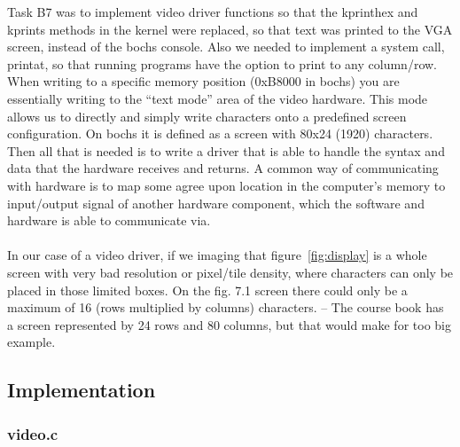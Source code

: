 Task B7 was to implement video driver functions so that the kprinthex and kprints methods in the kernel were replaced, so that text was printed to the VGA screen, instead of the bochs console. Also we needed to implement a system call, printat, so that running programs have the option to print to any column/row. When writing to a specific memory position (0xB8000 in bochs) you are essentially writing to the ``text mode'' area of the video hardware. This mode allows us to directly and simply write characters onto a predefined screen configuration. On bochs it is defined as a screen with 80x24 (1920) characters. Then all that is needed is to write a driver that is able to handle the syntax and data that the hardware receives and returns. A common way of communicating with hardware is to map some agree upon location in the computer's memory to input/output signal of another hardware component, which the software and hardware is able to communicate via.\\\\

In our case of a video driver, if we imaging that figure~\ref{fig:display} is a whole screen with very bad resolution or pixel/tile density, where characters can only be placed in those limited boxes. On the fig. 7.1 screen there could only be a maximum of 16 (rows multiplied by columns) characters. – The course book has a screen represented by 24 rows and 80 columns, but that would make for too big example.
\subsection{Implementation}
\subsubsection*{video.c}


